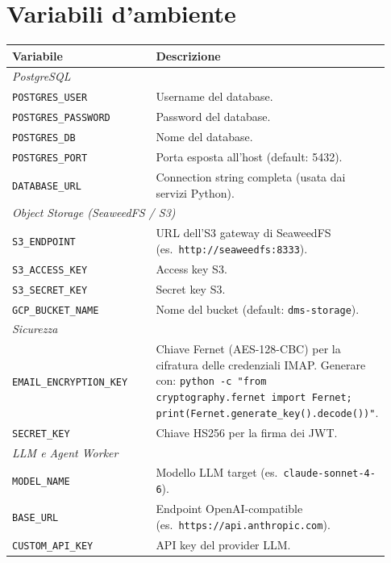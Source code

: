 \chapter{Variabili d'ambiente}
\label{app:env}

\begin{longtable}{p{0.38\linewidth} p{0.55\linewidth}}
\toprule
\textbf{Variabile} & \textbf{Descrizione} \\
\midrule
\endhead
\multicolumn{2}{l}{\textit{PostgreSQL}} \\[2pt]
\texttt{POSTGRES\_USER}          & Username del database. \\
\texttt{POSTGRES\_PASSWORD}      & Password del database. \\
\texttt{POSTGRES\_DB}            & Nome del database. \\
\texttt{POSTGRES\_PORT}          & Porta esposta all'host (default: 5432). \\
\texttt{DATABASE\_URL}           & Connection string completa (usata dai servizi Python). \\
\midrule
\multicolumn{2}{l}{\textit{Object Storage (SeaweedFS / S3)}} \\[2pt]
\texttt{S3\_ENDPOINT}            & URL dell'S3 gateway di SeaweedFS (es.\ \texttt{http://seaweedfs:8333}). \\
\texttt{S3\_ACCESS\_KEY}         & Access key S3. \\
\texttt{S3\_SECRET\_KEY}         & Secret key S3. \\
\texttt{GCP\_BUCKET\_NAME}       & Nome del bucket (default: \texttt{dms-storage}). \\
\midrule
\multicolumn{2}{l}{\textit{Sicurezza}} \\[2pt]
\texttt{EMAIL\_ENCRYPTION\_KEY}  & Chiave Fernet (AES-128-CBC) per la cifratura delle credenziali IMAP. Generare con: \texttt{python -c "from cryptography.fernet import Fernet; print(Fernet.generate\_key().decode())"}. \\
\texttt{SECRET\_KEY}             & Chiave HS256 per la firma dei JWT. \\
\midrule
\multicolumn{2}{l}{\textit{LLM e Agent Worker}} \\[2pt]
\texttt{MODEL\_NAME}             & Modello LLM target (es.\ \texttt{claude-sonnet-4-6}). \\
\texttt{BASE\_URL}               & Endpoint OpenAI-compatible (es.\ \texttt{https://api.anthropic.com}). \\
\texttt{CUSTOM\_API\_KEY}        & API key del provider LLM. \\

\end{longtable}
